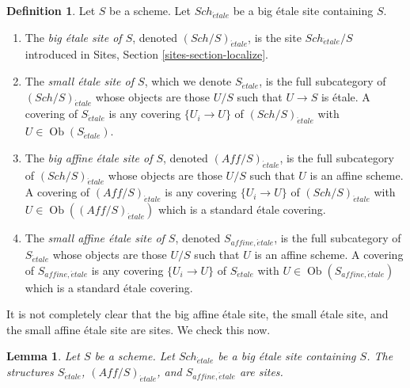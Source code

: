 \documentclass{stacks-project}
\theoremstyle{plain}
\newtheorem{lemma}[subsection]{Lemma}
\theoremstyle{definition}
\newtheorem{definition}[subsection]{Definition}
\theoremstyle{remark}
\numberwithin{equation}{subsection}
\def\Sch{\mathit{Sch}}
\def\Ob{\mathop{\mathrm{Ob}}\nolimits}
\def\etale{{\acute{e}tale}}
\begin{document}
\begin{definition}
\label{definition-big-small-etale}
Let $S$ be a scheme. Let $\Sch_\etale$ be a big \'etale
site containing $S$.
\begin{enumerate}
\item The {\it big \'etale site of $S$}, denoted
$(\Sch/S)_\etale$, is the site
$\Sch_\etale/S$ introduced in
Sites, Section \ref{sites-section-localize}.
\item The {\it small \'etale site of $S$}, which we denote
$S_\etale$, is the full subcategory of
$(\Sch/S)_\etale$
whose objects are those $U/S$ such that $U \to S$ is \'etale.
A covering of $S_\etale$ is any covering $\{U_i \to U\}$ of
$(\Sch/S)_\etale$ with $U \in \Ob(S_\etale)$.
\item The {\it big affine \'etale site of $S$}, denoted
$(\textit{Aff}/S)_\etale$, is the full subcategory of
$(\Sch/S)_\etale$ whose objects are those $U/S$
such that $U$ is an affine scheme.
A covering of $(\textit{Aff}/S)_\etale$ is any covering
$\{U_i \to U\}$ of $(\Sch/S)_\etale$ with $U \in \Ob((\textit{Aff}/S)_\etale)$
which is a standard \'etale covering.
\item The {\it small affine \'etale site of $S$}, denoted
$S_{affine, \etale}$, is the full subcategory of $S_\etale$
whose objects are those $U/S$ such that $U$ is an affine scheme.
A covering of $S_{affine, \etale}$ is any covering $\{U_i \to U\}$
of $S_\etale$ with $U \in \Ob(S_{affine, \etale})$ which is a standard
\'etale covering.
\end{enumerate}
\end{definition}

\noindent
It is not completely clear that the big affine \'etale site,
the small \'etale site, and the small affine \'etale site are sites.
We check this now.

\begin{lemma}
\label{lemma-verify-site-etale}
Let $S$ be a scheme. Let $\Sch_\etale$ be a big \'etale
site containing $S$.
The structures $S_\etale$, $(\textit{Aff}/S)_\etale$, and $S_{affine, \etale}$
are sites.
\end{lemma}
\end{document}

